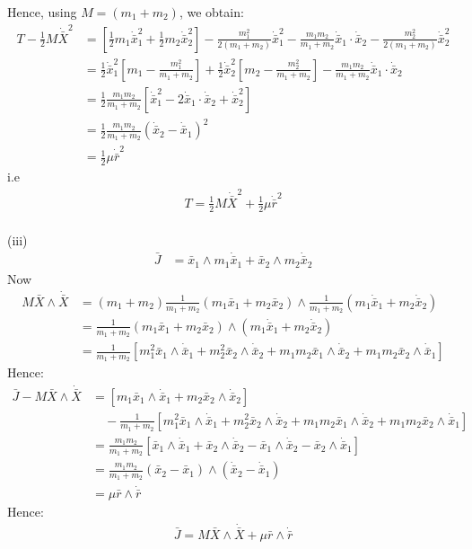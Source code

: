 \documentclass[12pt]{article}
\begin{document}
Hence, using $M=(m_1+m_2)$, we obtain:
\begin{align*}
T-\frac{1}{2}M\dot{\bar{X}}^2
&=
\left[
\frac{1}{2}m_1\dot{\bar{x}}_1^2
+\frac{1}{2}m_2\dot{\bar{x}}_2^2
\right]
-\frac{m_1^2}{2(m_1+m_2)}\dot{\bar{x}}_1^2
-\frac{m_1m_2}{m_1+m_2}\dot{\bar{x}}_1\cdot\dot{\bar{x}}_2 -\frac{m_2^2}{2(m_1+m_2)}\dot{\bar{x}}_2^2 \\
&=
\frac{1}{2}\dot{\bar{x}}_1^2
\left[m_1-\frac{m_1^2}{m_1+m_2}\right]
+\frac{1}{2}\dot{\bar{x}}_2^2
\left[m_2-\frac{m_2^2}{m_1+m_2}\right] -\frac{m_1m_2}{m_1+m_2}
\dot{\bar{x}}_1\cdot\dot{\bar{x}}_2 \\
&=
\frac{1}{2}\frac{m_1m_2}{m_1+m_2}
\left[
\dot{\bar{x}}_1^2
-2\dot{\bar{x}}_1\cdot\dot{\bar{x}}_2
+\dot{\bar{x}}_2^2
\right] \\
&=
\frac{1}{2}\frac{m_1m_2}{m_1+m_2}
\left(\dot{\bar{x}}_2-\dot{\bar{x}}_1\right)^2 \\
&=
\frac{1}{2}\mu\dot{\bar{r}}^2
\end{align*}
i.e
\begin{align*}
T=\frac{1}{2}M\dot{\bar{X}}^2+\frac{1}{2}\mu\dot{\bar{r}}^2
\end{align*}
\\
(iii) \begin{align*}
\bar{J} &= \bar{x}_1 \wedge m_1\dot{\bar{x}}_1 + \bar{x}_2 \wedge m_2\dot{\bar{x}}_2
\end{align*}
Now
\begin{align*}
M\bar{X}\wedge\dot{\bar{X}}
&= (m_1+m_2)\frac{1}{m_1+m_2}(m_1\bar{x}_1+m_2\bar{x}_2)
\wedge\frac{1}{m_1+m_2}(m_1\dot{\bar{x}}_1+m_2\dot{\bar{x}}_2) \\
&= \frac{1}{m_1+m_2}(m_1\bar{x}_1+m_2\bar{x}_2)
\wedge(m_1\dot{\bar{x}}_1+m_2\dot{\bar{x}}_2) \\
&= \frac{1}{m_1+m_2}\left[
m_1^2\bar{x}_1\wedge\dot{\bar{x}}_1
+m_2^2\bar{x}_2\wedge\dot{\bar{x}}_2
+m_1m_2\bar{x}_1\wedge\dot{\bar{x}}_2
+m_1m_2\bar{x}_2\wedge\dot{\bar{x}}_1
\right]
\end{align*}
Hence:
\begin{align*}
\bar{J}-M\bar{X}\wedge\dot{\bar{X}}
&=
\left[
m_1\bar{x}_1\wedge\dot{\bar{x}}_1
+m_2\bar{x}_2\wedge\dot{\bar{x}}_2
\right] \\
&\quad-\frac{1}{m_1+m_2}\left[
m_1^2\bar{x}_1\wedge\dot{\bar{x}}_1
+m_2^2\bar{x}_2\wedge\dot{\bar{x}}_2
+m_1m_2\bar{x}_1\wedge\dot{\bar{x}}_2
+m_1m_2\bar{x}_2\wedge\dot{\bar{x}}_1
\right] \\
&=
\frac{m_1m_2}{m_1+m_2}\left[
\bar{x}_1\wedge\dot{\bar{x}}_1
+\bar{x}_2\wedge\dot{\bar{x}}_2
-\bar{x}_1\wedge\dot{\bar{x}}_2
-\bar{x}_2\wedge\dot{\bar{x}}_1
\right] \\
&=
\frac{m_1m_2}{m_1+m_2}
(\bar{x}_2-\bar{x}_1)\wedge
(\dot{\bar{x}}_2-\dot{\bar{x}}_1) \\
&= \mu\bar{r}\wedge\dot{\bar{r}}
\end{align*}
Hence:
\begin{align*}
\bar{J}=M\bar{X}\wedge\dot{\bar{X}}+\mu\bar{r}\wedge\dot{\bar{r}}
\end{align*}
\end{document}
